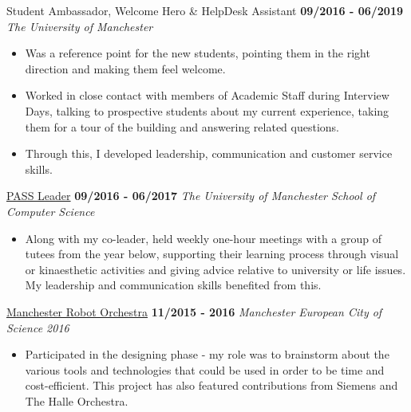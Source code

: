 \documentclass[]{friggeri-cv}
\begin{document}
   \entry
    {}
    {Student Ambassador, Welcome Hero \& HelpDesk Assistant}
    {\textbf{09/2016 - 06/2019}}
    {\emph{The University of Manchester}}
    \begin{itemize}
        \item Was a reference point for the new students, pointing them in the right direction and making them feel welcome. 
        \item Worked in close contact with members of Academic Staff during Interview Days, talking to prospective students about my current experience, taking them for a tour of the building and answering related questions. 
        \item Through this, I developed leadership, communication and customer service skills.\\
    \end{itemize}
  \entry
    {}
    {\href{http://www.pass.manchester.ac.uk/}{PASS Leader}}
    {\textbf{09/2016 - 06/2017}}
    {\emph{The University of Manchester School of Computer Science}}
    \begin{itemize}
        \item Along with my co-leader, held weekly one-hour meetings with a group of tutees from the year below, supporting their learning process through visual or kinaesthetic activities and giving advice relative to university or life issues. My leadership and communication skills benefited from this.\\
    \end{itemize}
  \entry
    {}
    {\href{http://manchestersciencecity.com/inspire/article/the-robots-are-coming/}{Manchester Robot Orchestra}}
    {\textbf{11/2015 - 2016}}
    {\emph{Manchester European City of Science 2016}}
    \begin{itemize}
        \item Participated in the designing phase - my role was to brainstorm about the various tools and technologies that could be used in order to be time and cost-efficient. This project has also featured contributions from Siemens and The Halle Orchestra.
    \end{itemize}

\clearpage
\end{document}
